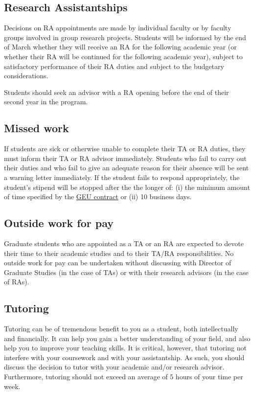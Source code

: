 \subsection{Research Assistantships}

Decisions on RA appointments are made by individual faculty or by
faculty groups involved in group research projects. Students will be
informed by the end of March whether they will receive an RA for the
following academic year (or whether their RA will be continued for
the following academic year), subject to satisfactory performance of
their RA duties and subject to the budgetary considerations.

Students should seek an advisor with a RA opening before the end of
their second year in the program.

\subsection{Missed work}

If students are sick or otherwise unable to
complete their TA or RA duties, they must inform their TA or RA
advisor immediately. Students who fail to carry out their duties and
who fail to give an adequate reason for their absence will be sent a
warning letter immediately. If the student fails to respond
appropriately, the student’s stipend will be stopped after the the
longer of: (i) the minimum amount of time
specified by the
\href{https://www.hr.msu.edu/documents/contracts/GEU2015-2019.pdf}{GEU
  contract} or (ii) 10 business days.

\subsection{Outside work for pay}

Graduate students who are appointed as a TA
or an RA are expected to devote their time to their academic studies
and to their TA/RA responsibilities. No outside work for pay can be
undertaken without discussing with Director of Graduate Studies (in
the case of TAs) or with their research advisors (in the case of RAs).

\subsection{Tutoring}

Tutoring can be of tremendous benefit to you as a student, both
intellectually and financially.  It can help you gain a better
understanding of your field, and also help you to improve your
teaching skills.  It is critical, however, that tutoring not interfere
with your coursework and with your assistantship.  As such, you should
discuss the decision to tutor with your academic and/or research
advisor.  Furthermore, tutoring should not exceed an average of 5
hours of your time per week.


